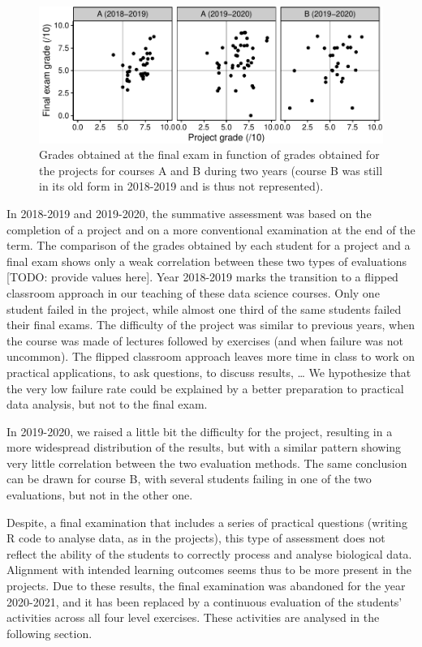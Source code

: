 \documentclass[
]{article}
\begin{document}
\begin{figure}
\centering
\includegraphics{teaching_data_science_files/figure-latex/fig_exams_projects-1.pdf}
\caption{\label{fig:fig_exams_projects} Grades obtained at the final
exam in function of grades obtained for the projects for courses A and B
during two years (course B was still in its old form in 2018-2019 and is
thus not represented).}
\end{figure}

In 2018-2019 and 2019-2020, the summative assessment was based on the
completion of a project and on a more conventional examination at the
end of the term. The comparison of the grades obtained by each student
for a project and a final exam shows only a weak correlation between
these two types of evaluations {[}TODO: provide values here{]}. Year
2018-2019 marks the transition to a flipped classroom approach in our
teaching of these data science courses. Only one student failed in the
project, while almost one third of the same students failed their final
exams. The difficulty of the project was similar to previous years, when
the course was made of lectures followed by exercises (and when failure
was not uncommon). The flipped classroom approach leaves more time in
class to work on practical applications, to ask questions, to discuss
results, \ldots{} We hypothesize that the very low failure rate could be
explained by a better preparation to practical data analysis, but not to
the final exam.

In 2019-2020, we raised a little bit the difficulty for the project,
resulting in a more widespread distribution of the results, but with a
similar pattern showing very little correlation between the two
evaluation methods. The same conclusion can be drawn for course B, with
several students failing in one of the two evaluations, but not in the
other one.

Despite, a final examination that includes a series of practical
questions (writing R code to analyse data, as in the projects), this
type of assessment does not reflect the ability of the students to
correctly process and analyse biological data. Alignment with intended
learning outcomes seems thus to be more present in the projects. Due to
these results, the final examination was abandoned for the year
2020-2021, and it has been replaced by a continuous evaluation of the
students' activities across all four level exercises. These activities
are analysed in the following section.
\end{document}
